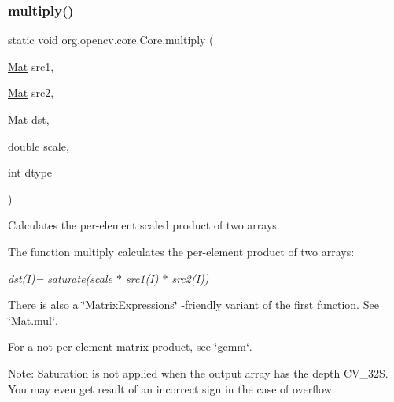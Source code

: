 \subsubsection{\texorpdfstring{multiply()}{multiply()}\hspace{0.1cm}{\footnotesize\ttfamily [1/6]}}
{\footnotesize\ttfamily static void org.\+opencv.\+core.\+Core.\+multiply (\begin{DoxyParamCaption}\item[{\mbox{\hyperlink{classorg_1_1opencv_1_1core_1_1_mat}{Mat}}}]{src1,  }\item[{\mbox{\hyperlink{classorg_1_1opencv_1_1core_1_1_mat}{Mat}}}]{src2,  }\item[{\mbox{\hyperlink{classorg_1_1opencv_1_1core_1_1_mat}{Mat}}}]{dst,  }\item[{double}]{scale,  }\item[{int}]{dtype }\end{DoxyParamCaption})\hspace{0.3cm}{\ttfamily [static]}}

Calculates the per-\/element scaled product of two arrays.

The function {\ttfamily multiply} calculates the per-\/element product of two arrays\+:

{\itshape dst(\+I)= saturate(scale $\ast$ src1(\+I) $\ast$ src2(\+I))}

There is also a \char`\"{}\+Matrix\+Expressions\char`\"{} -\/friendly variant of the first function. See \char`\"{}\+Mat.\+mul\char`\"{}.

For a not-\/per-\/element matrix product, see \char`\"{}gemm\char`\"{}.

Note\+: Saturation is not applied when the output array has the depth {\ttfamily C\+V\+\_\+32S}. You may even get result of an incorrect sign in the case of overflow.


